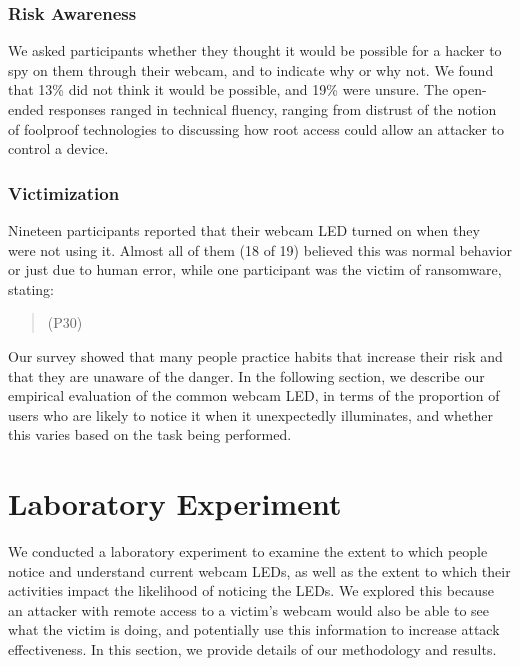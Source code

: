 \documentclass{sigchi}
\begin{document}
\subsubsection{Risk Awareness}

We asked participants whether they thought it would be possible for a hacker to spy on them through their webcam, and to indicate why or why not. We found that 13\% did not think it would be possible, and 19\% were unsure. The open-ended responses ranged in technical fluency, ranging from distrust of the notion of foolproof technologies to discussing how root access could allow an attacker to control a device. 

\subsubsection{Victimization}
Nineteen participants reported that their webcam LED turned on when they were not using it. Almost all of them (18 of 19) believed this was normal behavior or just due to human error, while one participant was the victim of ransomware, stating: 

\begin{quotation}
 (P30)\\
\end{quotation}

Our survey showed that many people practice habits that increase their risk and that they are unaware of the danger. In the following section, we describe our empirical evaluation of the common webcam LED, in terms of the proportion of users who are likely to notice it when it unexpectedly illuminates, and whether this varies based on the task being performed. 

\section{Laboratory Experiment}

We conducted a laboratory experiment to examine the extent to which people notice and understand current webcam LEDs, as well as the extent to which their activities impact the likelihood of noticing the LEDs. We explored this because an attacker with remote access to a victim's webcam would also be able to see what the victim is doing, and potentially use this information to increase attack effectiveness. In this section, we provide details of our methodology and results.
\end{document}
